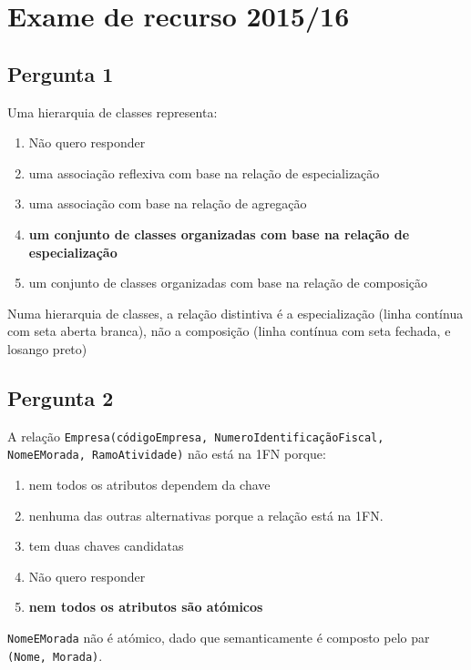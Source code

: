{
\renewcommand{\thechapter}{\arabic{chapter}R}
\setcounter{chapter}{15}
\chapter{Exame de recurso 2015/16}
\section{Pergunta 1}
Uma hierarquia de classes representa:
\begin{enumerate}[label=\alph*.]\itemsep0em
    \item Não quero responder
    \item uma associação reflexiva com base na relação de especialização
    \item uma associação com base na relação de agregação
    \item \textbf{um conjunto de classes organizadas com base na relação de especialização \greencheckmark}
    \item um conjunto de classes organizadas com base na relação de composição
\end{enumerate}
Numa hierarquia de classes, a relação distintiva é a especialização (linha contínua com seta aberta branca), não a composição (linha contínua com seta fechada, e losango preto)

\section{Pergunta 2}
A relação \texttt{Empresa(códigoEmpresa, NumeroIdentificaçãoFiscal, NomeEMorada, RamoAtividade)} não está na 1FN porque:
\begin{enumerate}[label=\alph*.]\itemsep0em
    \item nem todos os atributos dependem da chave
    \item nenhuma das outras alternativas porque a relação está na 1FN.
    \item tem duas chaves candidatas
    \item Não quero responder
    \item \textbf{nem todos os atributos são atómicos \greencheckmark}
\end{enumerate}
\texttt{NomeEMorada} não é atómico, dado que semanticamente é composto pelo par \texttt{(Nome, Morada)}.

}
